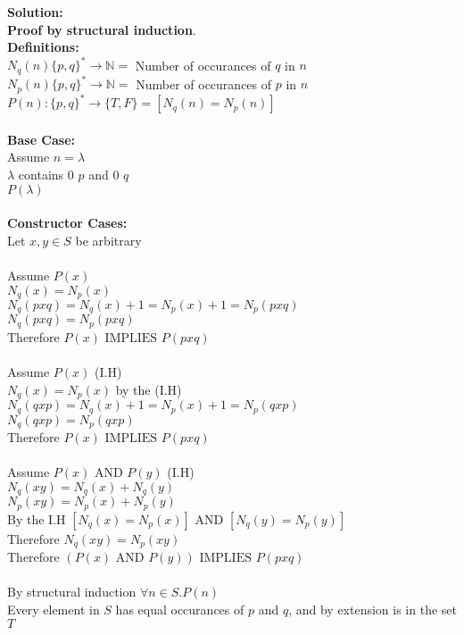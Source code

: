 \documentclass[11pt]{article}
\def\nats {{\mathbb N}}
\newcommand{\Implies}{\mbox{ IMPLIES }}
\newcommand{\And}{\mbox{ AND }}
\begin{document}
\begin{enumerate}
\begin{solution}
{\bf Solution:}\\
{\bf  Proof by structural induction}.\\
{\bf Definitions:}\\
$N_q(n) \{p,q\}^* \rightarrow \nats = $ Number of occurances of $q$ in $n$\\
$N_p(n) \{p,q\}^* \rightarrow \nats = $ Number of occurances of $p$ in $n$\\
$P(n): \{p,q\}^* \rightarrow \{T,F\}= \left[N_q(n) = N_p(n) \right]$\\\\
{\bf Base Case:}\\
\null\quad Assume $n=\lambda$\\
\null\quad $\lambda$ contains $0$ $p$ and $0$ $q$ \\
\null\quad $P(\lambda)$\\\\
{\bf Constructor Cases:}\\
\null\quad Let $x,y\in S$ be arbitrary\\\\
\null\qquad Assume $P(x)$\\
\null\qquad $N_q(x) = N_p(x)$\\
\null\qquad $N_q(pxq) = N_q(x) + 1=N_p(x) + 1= N_p(pxq)$\\
\null\qquad $N_q(pxq) = N_p(pxq)$\\
\null\quad Therefore $P(x)\Implies P(pxq)$\\\\
\null\qquad Assume $P(x)$ (I.H)\\
\null\qquad $N_q(x) = N_p(x)$ by the (I.H)\\
\null\qquad $N_q(qxp) = N_q(x) + 1=N_p(x) + 1= N_p(qxp)$\\
\null\qquad $N_q(qxp) = N_p(qxp)$\\
\null\quad Therefore $P(x)\Implies P(pxq)$\\\\
\null\qquad Assume $P(x)\And P(y)$ (I.H)\\
\null\qquad $N_q(xy) = N_q(x) + N_q(y)$\\
\null\qquad $N_p(xy) = N_p(x) + N_p(y)$\\
\null\qquad By the I.H $\left[N_q(x) = N_p(x)\right]\And\left[N_q(y) = N_p(y)\right]$\\
\null\qquad Therefore $N_q(xy) = N_p(xy)$\\
\null\quad Therefore $(P(x)\And P(y))\Implies P(pxq)$\\\\
By structural induction $\forall n\in S.P(n)$\\
Every element in $S$ has equal occurances of $p$ and $q$, and by extension is in the set $T$
\end{solution}


\end{enumerate}
\end{document}
